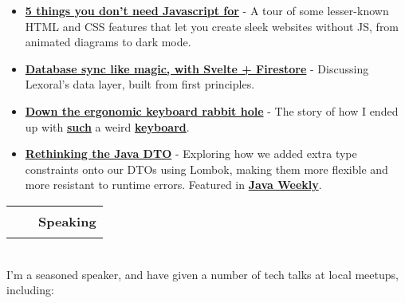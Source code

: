 \documentclass[hidelinks, 12pt, a4paper]{article}
\begin{document}
	\begin{itemize}
		\item \begin{small}\href{https://lexoral.com/blog/you-dont-need-js/}{\textbf{5 things you don't need Javascript for}} - A tour of some lesser-known HTML and CSS features that let you create sleek websites without JS, from animated diagrams to dark mode.\end{small}
		
		\item \begin{small}\href{https://lexoral.com/blog/svelte-firestore-binding/}{\textbf{Database sync like magic, with Svelte + Firestore}} - Discussing Lexoral's data layer, built from first principles.\end{small}
		
		\item \begin{small}\href{https://blog.scottlogic.com/2020/10/09/ergo-rabbit-hole.html}{\textbf{Down the ergonomic keyboard rabbit hole}} - The story of how I ended up with \href{https://blog.scottlogic.com/swaterman/assets/ergo-rabbit-hole/layer0.png}{\textbf{such}} a weird \href{https://ergodox-ez.com/}{\textbf{keyboard}}.\end{small}
		
		\item \begin{small}\href{https://blog.scottlogic.com/2020/01/03/rethinking-the-java-dto.html}{\textbf{Rethinking the Java DTO}} - Exploring how we added extra type constraints onto our DTOs using Lombok, making them more flexible and more resistant to runtime errors. Featured in \href{https://www.baeldung.com/java-weekly-315}{\textbf{Java Weekly}}.\end{small}
	\end{itemize}
	
	\begin{tabularx}{\textwidth}{@{}Xrr@{}}&
		\rule{50pt}{1pt}&
		\textbf{Speaking}
	\end{tabularx}\\

	I'm a seasoned speaker, and have given a number of tech talks at local meetups, including:
	
\end{document}

